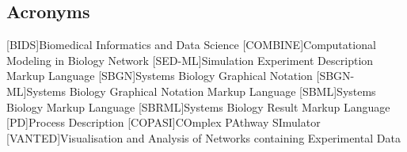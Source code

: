 \subsection*{Acronyms}
    \begin{acronym}[acrmeta]
        [BIDS]{Biomedical Informatics and Data Science}
        [COMBINE]{Computational Modeling in Biology Network}
        [SED-ML]{Simulation Experiment Description Markup Language}
        [SBGN]{Systems Biology Graphical Notation}
        [SBGN-ML]{Systems Biology Graphical Notation Markup Language}
        [SBML]{Systems Biology Markup Language}
        [SBRML]{Systems Biology Result Markup Language}
        [PD]{Process Description}
        [COPASI]{COmplex PAthway SImulator}
        [VANTED]{Visualisation and Analysis of Networks containing Experimental Data}
    \end{acronym}